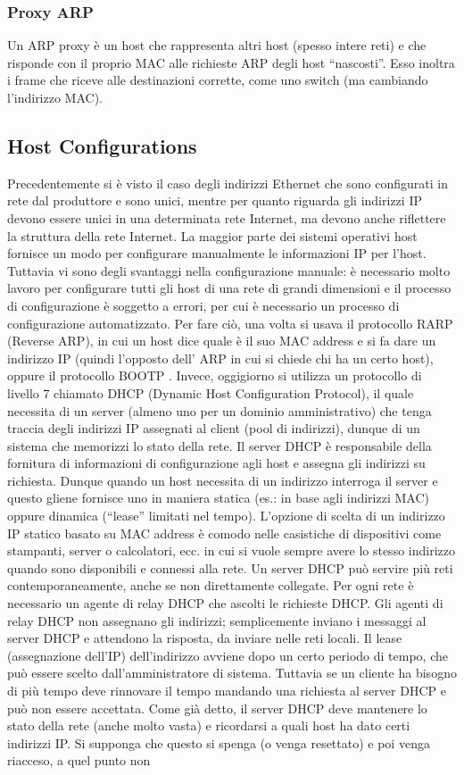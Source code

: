 \subsubsection{Proxy ARP}
Un ARP proxy è un host che rappresenta altri host (spesso intere reti) e che risponde con il proprio MAC alle richieste ARP degli host “nascosti”. Esso inoltra i frame che riceve alle destinazioni corrette, come uno switch (ma cambiando l’indirizzo MAC).
\subsection{Host Configurations}
Precedentemente si è visto il caso degli indirizzi Ethernet che sono configurati in rete dal produttore e sono unici, mentre per quanto riguarda gli indirizzi IP devono essere unici in una determinata rete Internet, ma devono anche riflettere la struttura della rete Internet. La maggior parte dei sistemi operativi host fornisce un modo per configurare manualmente le informazioni IP per l’host. Tuttavia vi sono degli svantaggi nella configurazione manuale: è necessario molto lavoro per configurare tutti gli host di una rete di grandi dimensioni e il processo di configurazione è soggetto a errori, per cui è necessario un processo di configurazione automatizzato. Per fare ciò, una volta si usava il protocollo RARP (Reverse ARP), in cui un host dice quale è il suo MAC address e si fa dare un indirizzo IP (quindi l’opposto dell’ ARP in cui si chiede chi ha un certo host), oppure il protocollo BOOTP . Invece, oggigiorno si utilizza un protocollo di livello 7 chiamato DHCP (Dynamic Host Configuration Protocol), il quale necessita di un server (almeno uno per un dominio amministrativo) che tenga traccia degli indirizzi IP  assegnati al client (pool di indirizzi), dunque di un sistema che memorizzi lo stato della rete. Il server DHCP è responsabile della fornitura di informazioni di configurazione agli host e assegna gli indirizzi su richiesta. Dunque quando un host necessita di un indirizzo interroga il server e questo gliene fornisce uno in maniera statica (es.: in base agli indirizzi MAC) oppure dinamica (“lease” limitati nel tempo). L’opzione di scelta di un indirizzo IP statico basato su MAC address è comodo nelle casistiche di dispositivi come stampanti, server o calcolatori, ecc. in cui si vuole sempre avere lo stesso indirizzo quando sono disponibili e connessi alla rete. Un server DHCP può servire più reti contemporaneamente, anche se non direttamente collegate. Per ogni rete è necessario un agente di relay DHCP che ascolti le richieste DHCP. Gli agenti di relay DHCP non assegnano gli indirizzi; semplicemente inviano i messaggi al server DHCP e attendono la risposta, da inviare nelle reti locali. Il lease (assegnazione dell’IP) dell’indirizzo avviene dopo un certo periodo di tempo, che può essere scelto dall’amministratore di sistema. Tuttavia se un cliente ha bisogno di più tempo deve rinnovare il tempo mandando una richiesta al server DHCP e può non essere accettata. Come già detto, il server DHCP deve mantenere lo stato della rete (anche molto vasta) e ricordarsi a quali host ha dato certi indirizzi IP. Si supponga che questo si spenga (o venga resettato) e poi venga riacceso, a quel punto non 